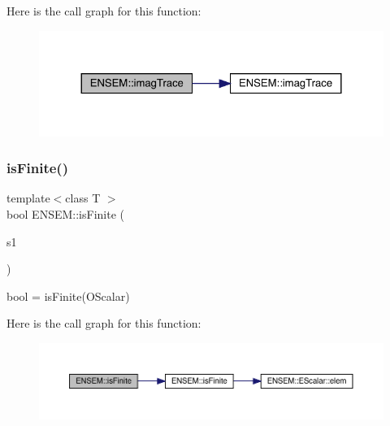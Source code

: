 Here is the call graph for this function\+:\nopagebreak
\begin{figure}[H]
\begin{center}
\leavevmode
\includegraphics[width=324pt]{d1/d71/group__obsscalar_ga1dff0d4b73bbb026e6a9287ffd531523_cgraph}
\end{center}
\end{figure}
\mbox{\label{group__obsscalar_gaff9bdb2f6b1615afede07ee45e2ed616}} 
\subsubsection{\texorpdfstring{isFinite()}{isFinite()}}
{\footnotesize\ttfamily template$<$class T $>$ \\
bool E\+N\+S\+E\+M\+::is\+Finite (\begin{DoxyParamCaption}\item[{const \mbox{\hyperlink{classENSEM_1_1OScalar}{O\+Scalar}}$<$ T $>$ \&}]{s1 }\end{DoxyParamCaption})}



bool = is\+Finite(\+O\+Scalar) 

Here is the call graph for this function\+:\nopagebreak
\begin{figure}[H]
\begin{center}
\leavevmode
\includegraphics[width=350pt]{d1/d71/group__obsscalar_gaff9bdb2f6b1615afede07ee45e2ed616_cgraph}
\end{center}
\end{figure}
\mbox{\label{group__obsscalar_ga53c459a4a8b7d6d7df49c71d8c998c48}} 
